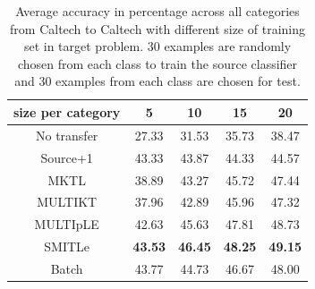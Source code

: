 \begin{table}[htbp]
  \centering
  \caption{Average accuracy in percentage across all categories from Caltech to Caltech with different size of training set in target problem. 30 examples are randomly chosen from each class to train the source classifier and 30 examples from each class are chosen for test. }
    \begin{tabular}{ccccc}
    \toprule
      size per category    & 5     & 10    & 15    & 20 \\
    \midrule
    No transfer &         27.33  &         31.53  &         35.73  &         38.47  \\
    Source+1    &         43.33  &         43.87   &         44.33  &         44.57   \\
    MKTL        &         38.89  &         43.27   &         45.72  &         47.44   \\
    MULTIKT     &         37.96  &         42.89   &         45.96  &         47.32  \\
    MULTIpLE    &         42.63  &         45.63   &         47.81  &         48.73 \\
    SMITLe        &         \textbf{43.53 }&         \textbf{46.45 } &         \textbf{48.25 } &         \textbf{49.15 } \\
        \midrule
    Batch       &         43.77  &         44.73   &         46.67  &         48.00 \\
    \bottomrule
    \end{tabular}%
  \label{tab:C2C}%
\end{table}%

